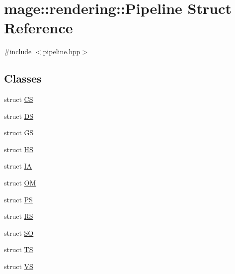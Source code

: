 \hypertarget{structmage_1_1rendering_1_1_pipeline}{}\section{mage\+:\+:rendering\+:\+:Pipeline Struct Reference}
\label{structmage_1_1rendering_1_1_pipeline}


{\ttfamily \#include $<$pipeline.\+hpp$>$}

\subsection*{Classes}
\begin{DoxyCompactItemize}
\item 
struct \hyperlink{structmage_1_1rendering_1_1_pipeline_1_1_c_s}{CS}
\item 
struct \hyperlink{structmage_1_1rendering_1_1_pipeline_1_1_d_s}{DS}
\item 
struct \hyperlink{structmage_1_1rendering_1_1_pipeline_1_1_g_s}{GS}
\item 
struct \hyperlink{structmage_1_1rendering_1_1_pipeline_1_1_h_s}{HS}
\item 
struct \hyperlink{structmage_1_1rendering_1_1_pipeline_1_1_i_a}{IA}
\item 
struct \hyperlink{structmage_1_1rendering_1_1_pipeline_1_1_o_m}{OM}
\item 
struct \hyperlink{structmage_1_1rendering_1_1_pipeline_1_1_p_s}{PS}
\item 
struct \hyperlink{structmage_1_1rendering_1_1_pipeline_1_1_r_s}{RS}
\item 
struct \hyperlink{structmage_1_1rendering_1_1_pipeline_1_1_s_o}{SO}
\item 
struct \hyperlink{structmage_1_1rendering_1_1_pipeline_1_1_t_s}{TS}
\item 
struct \hyperlink{structmage_1_1rendering_1_1_pipeline_1_1_v_s}{VS}
\end{DoxyCompactItemize}
